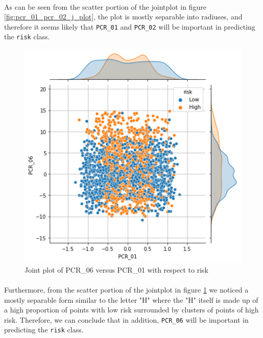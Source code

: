 \documentclass{article}
\newcommand{\code}[1]{\texttt{#1}}
\begin{document}
    \paragraph*{}
    As can be seen from the scatter portion of the jointplot in figure \ref{fig:pcr_01_pcr_02_j_plot}, the plot is mostly separable into radiuses, and therefore it seems likely that \code{PCR\_01} and \code{PCR\_02} will be important in predicting the \code{risk} class.
    \begin{figure}[H]
        \centering
        \includegraphics[scale=0.4]{q11_pcr_06_01_j_plot.png}
        \caption{Joint plot of PCR\_06 versus PCR\_01 with respect to risk}
        \label{fig:pcr_06_pcr_01_j_plot}
    \end{figure}
    \paragraph*{}
     Furthermore, from the scatter portion of the jointplot in figure \ref{fig:pcr_06_pcr_01_j_plot} we noticed a mostly separable form similar to the letter "H" where the "H" itself is made up of a high proportion of points with low risk surrounded by clusters of points of high risk. Therefore, we can conclude that in addition, \code{PCR\_06} will be important in predicting the \code{risk} class.
\end{document}
